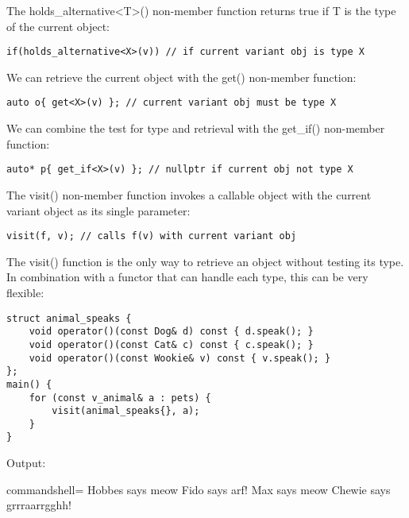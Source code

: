 The holds\_alternative<T>() non-member function returns true if T is the type of the current object:

\begin{lstlisting}[style=styleCXX]
if(holds_alternative<X>(v)) // if current variant obj is type X
\end{lstlisting}

We can retrieve the current object with the get() non-member function:

\begin{lstlisting}[style=styleCXX]
auto o{ get<X>(v) }; // current variant obj must be type X
\end{lstlisting}

We can combine the test for type and retrieval with the get\_if() non-member function:

\begin{lstlisting}[style=styleCXX]
auto* p{ get_if<X>(v) }; // nullptr if current obj not type X
\end{lstlisting}

The visit() non-member function invokes a callable object with the current variant object as its single parameter:

\begin{lstlisting}[style=styleCXX]
visit(f, v); // calls f(v) with current variant obj
\end{lstlisting}

The visit() function is the only way to retrieve an object without testing its type. In combination with a functor that can handle each type, this can be very flexible:

\begin{lstlisting}[style=styleCXX]
struct animal_speaks {
	void operator()(const Dog& d) const { d.speak(); }
	void operator()(const Cat& c) const { c.speak(); }
	void operator()(const Wookie& v) const { v.speak(); }
};
main() {
	for (const v_animal& a : pets) {
		visit(animal_speaks{}, a);
	}
}
\end{lstlisting}

Output:

\begin{tcblisting}{commandshell={}}
Hobbes says meow
Fido says arf!
Max says meow
Chewie says grrraarrgghh!
\end{tcblisting}



